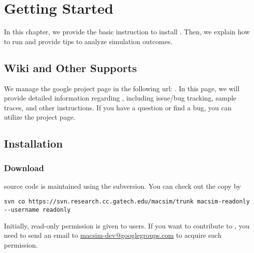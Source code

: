 

\chapter{Getting Started}


In this chapter, we provide the basic instruction to install
\SIM. Then, we explain how to run \SIM and provide tips to analyze
simulation outcomes.


\section{Wiki and Other Supports}

We manage the google project page in the following url:
. In this page, we will provide
detailed information regarding \SIM, including issue/bug tracking,
sample traces, and other instructions. If you have a question or find
a bug, you can utilize the project page.



\section{Installation}
\label{sec:installation}

\subsection{Download}

\SIM source code is maintained using the subversion. 
You can check out the \SIM copy by


\begin{Verbatim}
svn co https://svn.research.cc.gatech.edu/macsim/trunk macsim-readonly --username readonly
\end{Verbatim}

\noindent
Initially, read-only permission is given to users. If you want to
contribute to \SIM, you need to send an email to
\href{mailto:macsim-dev@googlegroups.com}{macsim-dev@googlegroups.com}
to acquire such permission.





